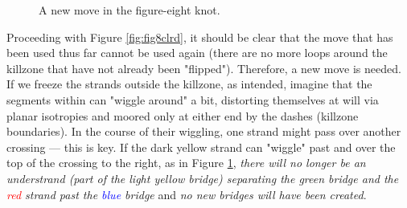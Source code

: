 \documentclass[titlepage,11pt]{article}
\begin{document}
\begin{figure}[h!]
    \centering
    \caption{A new move in the figure-eight knot.}
    \label{fig:fig8clr-2}
\end{figure}

Proceeding with Figure \ref{fig:fig8clrd}, it should be clear that the move that has been used thus far cannot be used again (there are no more loops around the killzone that have not already been "flipped"). Therefore, a new move is needed. If we freeze the strands outside the killzone, as intended, imagine that the segments within can "wiggle around" a bit, distorting themselves at will via planar isotropies and moored only at either end by the dashes (killzone boundaries). In the course of their wiggling, one strand might pass over another crossing --- this is key. If the \textcolor{yly}{dark yellow} strand can "wiggle" past and over the top of the crossing to the right, as in Figure \ref{fig:fig8clr-2}, \emph{there will no longer be an understrand (part of the \textcolor{ylz}{light yellow} bridge) separating the \textcolor{grx}{green} bridge and the \textcolor{red}{red} strand past the \textcolor{blue}{blue} bridge} and \emph{no new bridges will have been created}.\par
\end{document}
